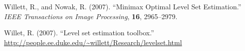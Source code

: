 \documentclass[11pt]{article}
\begin{document}
\begin{thebibliography}{}



  Willett, R.,  and Nowak, R. (2007).
\newblock ``Minimax Optimal Level Set Estimation.'' 
\newblock \emph{IEEE Transactions on Image Processing}, \textbf{16}, 2965--2979.

  Willet, R. (2007).
\newblock ``Level set estimation toolbox.''  
\newblock \url{http://people.ee.duke.edu/~willett/Research/levelset.html}
\end{thebibliography}
\end{document}
